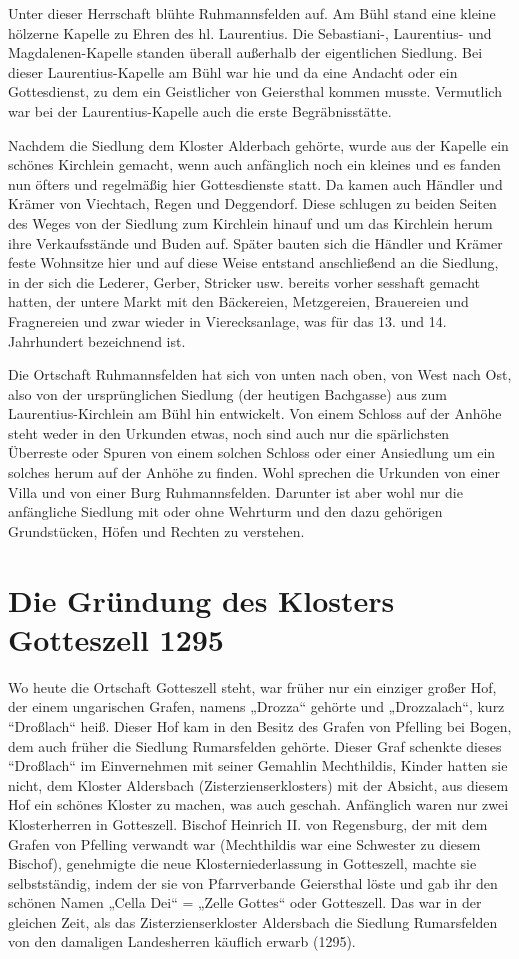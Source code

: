 \documentclass[12pt,a4paper]{book}
\begin{document}
Unter dieser Herrschaft blühte Ruhmannsfelden auf. Am Bühl stand eine kleine
hölzerne Kapelle zu Ehren des hl. Laurentius. Die Sebastiani-, Laurentius- und
Magdalenen-Kapelle standen überall außerhalb der eigentlichen Siedlung. Bei
dieser Laurentius-Kapelle am Bühl war hie und da eine Andacht oder ein
Gottesdienst, zu dem ein Geistlicher von Geiersthal kommen musste. Vermutlich
war bei der Laurentius-Kapelle auch die erste Begräbnisstätte.

Nachdem die Siedlung dem Kloster Alderbach gehörte, wurde aus der Kapelle ein
schönes Kirchlein gemacht, wenn auch anfänglich noch ein kleines und es fanden
nun öfters und regelmäßig hier Gottesdienste statt. Da kamen auch Händler und
Krämer von Viechtach, Regen und Deggendorf. Diese schlugen zu beiden Seiten des
Weges von der Siedlung zum Kirchlein hinauf und um das Kirchlein herum ihre
Verkaufsstände und Buden auf. Später bauten sich die Händler und Krämer feste
Wohnsitze hier und auf diese Weise entstand anschließend an die Siedlung, in der
sich die Lederer, Gerber, Stricker usw. bereits vorher sesshaft gemacht hatten,
der untere Markt mit den Bäckereien, Metzgereien, Brauereien und Fragnereien und
zwar wieder in Vierecksanlage, was für das 13. und 14. Jahrhundert bezeichnend
ist.

Die Ortschaft Ruhmannsfelden hat sich von unten nach oben, von West nach Ost,
also von der ursprünglichen Siedlung (der heutigen Bachgasse) aus zum
Laurentius-Kirchlein am Bühl hin entwickelt. Von einem Schloss auf der Anhöhe
steht weder in den Urkunden etwas, noch sind auch nur die spärlichsten Überreste
oder Spuren von einem solchen Schloss oder einer Ansiedlung um ein solches herum
auf der Anhöhe zu finden. Wohl sprechen die Urkunden von einer Villa und von
einer Burg Ruhmannsfelden. Darunter ist aber wohl nur die anfängliche Siedlung
mit oder ohne Wehrturm und den dazu gehörigen Grundstücken, Höfen und Rechten zu
verstehen.

\section{Die Gründung des Klosters Gotteszell 1295}

Wo heute die Ortschaft Gotteszell steht, war früher nur ein einziger großer Hof,
der einem ungarischen Grafen, namens „Drozza“ gehörte und „Drozzalach“, kurz
“Droßlach“ heiß. Dieser Hof kam in den Besitz des Grafen von Pfelling bei Bogen,
dem auch früher die Siedlung Rumarsfelden gehörte. Dieser Graf schenkte dieses
“Droßlach“ im Einvernehmen mit seiner Gemahlin Mechthildis, Kinder hatten sie
nicht, dem Kloster Aldersbach (Zisterzienserklosters) mit der Absicht, aus
diesem Hof ein schönes Kloster zu machen, was auch geschah. Anfänglich waren nur
zwei Klosterherren in Gotteszell. Bischof Heinrich II. von Regensburg, der mit
dem Grafen von Pfelling verwandt war (Mechthildis war eine Schwester zu diesem
Bischof), genehmigte die neue Klosterniederlassung in Gotteszell, machte sie
selbstständig, indem der sie von Pfarrverbande Geiersthal löste und gab ihr den
schönen Namen „Cella Dei“ = „Zelle Gottes“ oder Gotteszell. Das war in der
gleichen Zeit, als das Zisterzienserkloster Aldersbach die Siedlung Rumarsfelden
von den damaligen Landesherren käuflich erwarb (1295).
\end{document}
